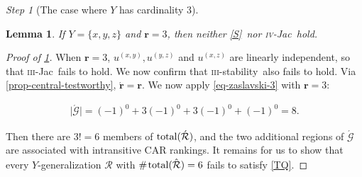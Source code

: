 \documentclass[ecta,nameyear,draft]{econsocart}
\makeatletter
\newcommand{\countof}{\mathbin{\#}\hskip1pt}
\newcommand{\mc}{\mathcal}
\newcommand\mpplus{\text{\srcsize$+\mkern-2mu+$}}
\newcommand{\hext}{\mathrel{\hat{\mathrel{\mathcal R}}}}
\newcommand{\aext}{\mathrel{\acute{\mathrel{\mathcal R}}}}
\newcommand{\total}{\textup{total}}
\newcommand{\xy}{{(x, y)}}
\newcommand{\yz}{{(y,z)}}
\newcommand{\xz}{{(x,z)}}
\newcommand{\stability}{\ref{S}}
\newcommand{\threepru}{\textsc{iii}-\textup{{stability}}}
\newcommand{\fourjac}{\textup{\textsc{iv}-Jac}}
\newcommand{\threejac}{\textup{\textsc{iii}-Jac}}
\newcommand{\srcsize}{\@setfontsize{\srcsize}{3pt}{3pt}}
\theoremstyle{plain}
\newtheorem{lemma}{Lemma}[theorem]
\theoremstyle{remark}
\newtheorem{step}{Step}[section]
\makeatother
\begin{document}
\begin{appendix}
\begin{step}[The case where $Y$ has cardinality $3$]
    \begin{lemma}\label{lem-Y3-r3} If $Y = \{x,y,z\}$ and $\mathbf{r} = 3$, then
      neither \stability\ nor \fourjac\ hold.
    \end{lemma}
    \begin{proof}[Proof of \cref{lem-Y3-r3}] When $\mathbf r = 3$, $u^{\xy},
      u^{\yz}$ and $u^{\xz}$ are linearly independent, so that \threejac\ fails
      to hold. We now confirm that \threepru\ also fails to hold.  Via
      \cref{prop-central-testworthy}, $\acute{\mathbf r} = \mathbf r$. We now
      apply \cref{eq-zaslavski-3} with $\mathbf{r}=3$:
      \begin{linenomath*}
        \begin{align*}
          \lvert \acute{\mc G}\rvert = (-1)^{0}+3(-1)^{0}+ 3(-1)^{0}+(-1)^{0} =
          8.
        \end{align*}
      \end{linenomath*}
      Then there are $3!=6$ members of $\total (\aext)$, and the two additional
      regions of $\acute {\mc G}$ are associated with intransitive CAR rankings.
      It remains for us to show that every $Y$-generalization $\hext$ with
      $\countof \total (\hext) = 6$ fails to satisfy \ref{TQ}.



\end{proof}
\end{step}
\end{appendix}
\end{document}
